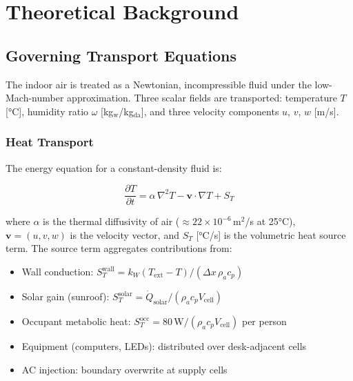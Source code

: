 \documentclass[12pt,a4paper]{report}
\begin{document}
\chapter{Theoretical Background}
\label{ch:theory}

\section{Governing Transport Equations}
\label{sec:govern}

The indoor air is treated as a Newtonian, incompressible fluid under the low-Mach-number approximation. Three scalar fields are transported: temperature $T$ [°C], humidity ratio $\omega$ [kg$_\text{w}$/kg$_\text{da}$], and three velocity components $u$, $v$, $w$ [m/s].

\subsection{Heat Transport}
\label{subsec:heat}

The energy equation for a constant-density fluid is:

\begin{equation}
  \frac{\partial T}{\partial t} = \alpha\,\nabla^2 T - \mathbf{v}\cdot\nabla T + S_T
  \label{eq:heat}
\end{equation}

where $\alpha$ is the thermal diffusivity of air ($\approx 22\times10^{-6}$\,m$^2$/s at 25°C), $\mathbf{v} = (u,v,w)$ is the velocity vector, and $S_T$ [°C/s] is the volumetric heat source term. The source term aggregates contributions from:

\begin{itemize}
  \item Wall conduction: $S_T^\text{wall} = k_W(T_\text{ext} - T)/(\Delta x\,\rho_a c_p)$
  \item Solar gain (sunroof): $S_T^\text{solar} = \dot{Q}_\text{solar}/(\rho_a c_p V_\text{cell})$
  \item Occupant metabolic heat: $S_T^\text{occ} = 80\,\text{W}/(\rho_a c_p V_\text{cell})$ per person
  \item Equipment (computers, LEDs): distributed over desk-adjacent cells
  \item AC injection: boundary overwrite at supply cells
\end{itemize}
\end{document}
